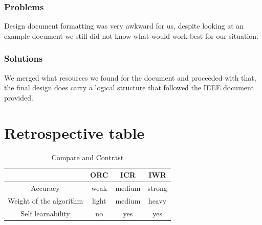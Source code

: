 \documentclass[onecolumn, draftclsnofoot,10pt, compsoc]{IEEEtran}
\begin{document}
\subsubsection{Problems}
Design document formatting was very awkward for us, despite looking at an example document we still did not know what would work best for our situation.

\subsubsection{Solutions}
We merged what resources we found for the document and proceeded with that, the final design does carry a logical structure that followed the IEEE document provided.

\section{Retrospective table}
\begin{table}[h]
\centering
\begin{tabular}{ | c | c | c | c |}
\hline
 & ORC & ICR & IWR\\ 
\hline
Accuracy & weak & medium & strong \\ 
\hline
Weight of the algorithm & light & medium & heavy\\ 
\hline
Self learnability & no & yes & yes\\ 
\hline
\end{tabular}
\caption{Compare and Contrast}
\label{table:1}
\end{table}
\end{document}
